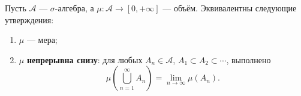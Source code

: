 \label{definition:14}

\begin{theorem}
Пусть $\mathcal A$ --- $\sigma$-алгебра, а $\mu:\mathcal A\to[0,+\infty]$ --- объём.
Эквивалентны следующие утверждения:
\begin{enumerate}
  \item $\mu$ --- мера;
  \item $\mu$ \textbf{непрерывна снизу}: для любых $A_n\in\mathcal A$, $A_1\subset A_2\subset\cdots$, выполнено
  \[
    \mu\left(\bigcup_{n=1}^{\infty}A_n\right)
    =\lim_{n\to\infty}\mu(A_n).
  \]
\end{enumerate}
\end{theorem}
